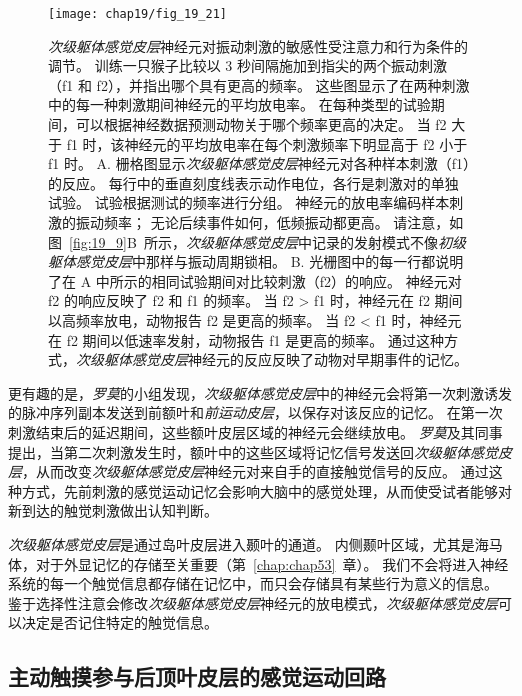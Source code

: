 \begin{figure}[htbp]
	\centering
	\texttt{[image: chap19/fig\_19\_21]}
	\caption{\textit{次级躯体感觉皮层}神经元对振动刺激的敏感性受注意力和行为条件的调节。
		训练一只猴子比较以 3 秒间隔施加到指尖的两个振动刺激（f1 和 f2），并指出哪个具有更高的频率。
		这些图显示了在两种刺激中的每一种刺激期间神经元的平均放电率。
		在每种类型的试验期间，可以根据神经数据预测动物关于哪个频率更高的决定。
		当 f2 大于 f1 时，该神经元的平均放电率在每个刺激频率下明显高于 f2 小于 f1 时\cite{romo2002neuronal}。
		A. 栅格图显示\textit{次级躯体感觉皮层}神经元对各种样本刺激（f1）的反应。
		每行中的垂直刻度线表示动作电位，各行是刺激对的单独试验。
		试验根据测试的频率进行分组。
		神经元的放电率编码样本刺激的振动频率； 无论后续事件如何，低频振动都更高。
		请注意，如图~\ref{fig:19_9}B~所示，\textit{次级躯体感觉皮层}中记录的发射模式不像\textit{初级躯体感觉皮层}中那样与振动周期锁相。
		B. 光栅图中的每一行都说明了在 A 中所示的相同试验期间对比较刺激（f2）的响应。
		神经元对 f2 的响应反映了 f2 和 f1 的频率。
		当 f2 > f1 时，神经元在 f2 期间以高频率放电，动物报告 f2 是更高的频率。
		当 f2 < f1 时，神经元在 f2 期间以低速率发射，动物报告 f1 是更高的频率。
		通过这种方式，\textit{次级躯体感觉皮层}神经元的反应反映了动物对早期事件的记忆。}
	\label{fig:19_21}
\end{figure}


更有趣的是，\textit{罗莫}的小组发现，\textit{次级躯体感觉皮层}中的神经元会将第一次刺激诱发的脉冲序列副本发送到前额叶和\textit{前运动皮层}，以保存对该反应的记忆。
在第一次刺激结束后的延迟期间，这些额叶皮层区域的神经元会继续放电。
\textit{罗莫}及其同事提出，当第二次刺激发生时，额叶中的这些区域将记忆信号发送回\textit{次级躯体感觉皮层}，从而改变\textit{次级躯体感觉皮层}神经元对来自手的直接触觉信号的反应。
通过这种方式，先前刺激的感觉运动记忆会影响大脑中的感觉处理，从而使受试者能够对新到达的触觉刺激做出认知判断。


\textit{次级躯体感觉皮层}是通过岛叶皮层进入颞叶的通道。
内侧颞叶区域，尤其是海马体，对于外显记忆的存储至关重要（第~\ref{chap:chap53}~章）。
我们不会将进入神经系统的每一个触觉信息都存储在记忆中，而只会存储具有某些行为意义的信息。
鉴于选择性注意会修改\textit{次级躯体感觉皮层}神经元的放电模式，\textit{次级躯体感觉皮层}可以决定是否记住特定的触觉信息。



\subsection{主动触摸参与后顶叶皮层的感觉运动回路}

